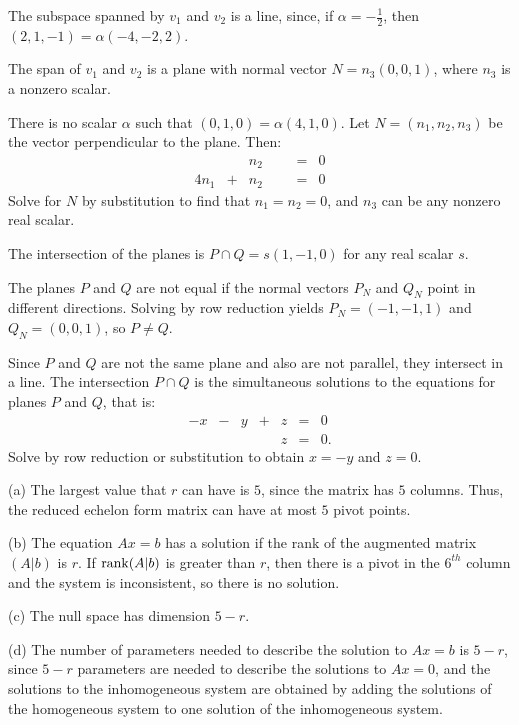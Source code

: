  \ans The subspace spanned by $v_1$ and $v_2$ is a line,
since, if $\alpha = -\frac{1}{2}$, then $(2,1,-1) = \alpha(-4,-2,2)$.

 \ans The span of $v_1$ and $v_2$ is a plane with normal
vector $N = n_3(0,0,1)$, where $n_3$ is a nonzero scalar.

\soln There is no scalar $\alpha$ such that $(0,1,0) = \alpha(4,1,0)$. 
Let $N = (n_1,n_2,n_3)$ be the vector perpendicular to the plane.  Then:
\[
\begin{array}{rrrrrcl}
& & n_2 & & & = & 0 \\
4n_1 & + & n_2 & & & = & 0 \end{array}
\]
Solve for $N$ by substitution to find that $n_1 = n_2 = 0$, and
$n_3$ can be any nonzero real scalar.

\ans The intersection of the planes is $P \cap Q = s(1,-1,0)$ for any
real scalar $s$.

\soln The planes $P$ and $Q$ are not equal if the normal vectors $P_N$
and $Q_N$ point in different directions.  Solving by row reduction
yields $P_N = (-1,-1,1)$ and $Q_N = (0,0,1)$, so $P \neq Q$.

\para Since $P$ and $Q$ are not the same plane and also are not
parallel, they intersect in a line.  The intersection $P \cap Q$ is
the simultaneous solutions to the equations for planes $P$ and $Q$,
that is:
\[ \begin{array}{rrrrrrl}
-x & - & y & + & z & = & 0 \\
& & & & z & = & 0. \end{array} \]
Solve by row reduction or substitution to obtain $x = -y$ and $z = 0$.

(a) The largest value that $r$ can have is $5$, since the matrix has
$5$ columns.  Thus, the reduced echelon form matrix can have at most
$5$ pivot points.

(b) The equation $Ax = b$ has a solution if the rank of the augmented
matrix $(A|b)$ is $r$.  If ${\rm rank} (A|b)$ is greater than $r$, then
there is a pivot in the $6^{th}$ column and the system is
inconsistent, so there is no solution.

(c) The null space has dimension $5 - r$.

(d) The number of parameters needed to describe the solution to
$Ax = b$ is $5 - r$, since $5 - r$ parameters are needed to describe
the solutions to $Ax = 0$, and the solutions to the inhomogeneous
system are obtained by adding the solutions of the homogeneous system
to one solution of the inhomogeneous system.


